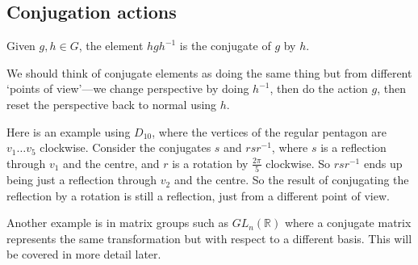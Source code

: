 \subsection{Conjugation actions}
\begin{definition}
	Given \(g, h \in G\), the element \(hgh^{-1}\) is the conjugate of \(g\) by \(h\).
\end{definition}
We should think of conjugate elements as doing the same thing but from different `points of view'---we change perspective by doing \(h^{-1}\), then do the action \(g\), then reset the perspective back to normal using \(h\).

Here is an example using \(D_{10}\), where the vertices of the regular pentagon are \(v_1 \dots v_5\) clockwise.
Consider the conjugates \(s\) and \(rsr^{-1}\), where \(s\) is a reflection through \(v_1\) and the centre, and \(r\) is a rotation by \(\frac{2\pi}{5}\) clockwise.
So \(rsr^{-1}\) ends up being just a reflection through \(v_2\) and the centre.
So the result of conjugating the reflection by a rotation is still a reflection, just from a different point of view.

Another example is in matrix groups such as \(GL_n(\mathbb R)\) where a conjugate matrix represents the same transformation but with respect to a different basis.
This will be covered in more detail later.


